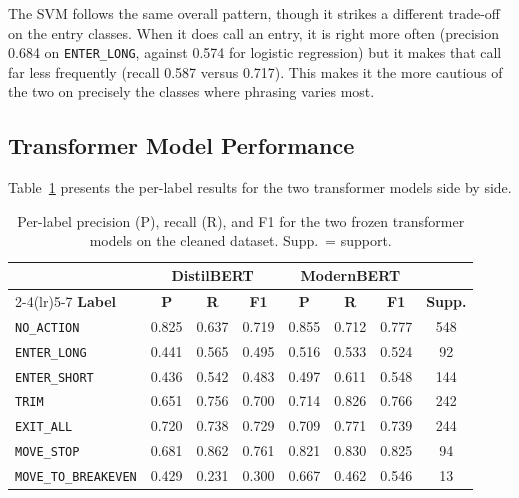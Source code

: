 The SVM follows the same overall pattern, though it strikes a different trade-off on the entry classes. When it does call an entry, it is right more often (precision 0.684 on \texttt{ENTER\_LONG}, against 0.574 for logistic regression) but it makes that call far less frequently (recall 0.587 versus 0.717). This makes it the more cautious of the two on precisely the classes where phrasing varies most.

\subsection{Transformer Model Performance}
\label{sec:results_transformers}

Table~\ref{tab:per_label_transformers} presents the per-label results for the two transformer models side by side.

\begin{table}[H]
\centering
\caption{Per-label precision (P), recall (R), and F1 for the two frozen transformer models on the cleaned dataset. Supp.\ = support.}
\label{tab:per_label_transformers}
\small
\setlength{\tabcolsep}{4pt}
\begin{tabular}{@{}l ccc ccc c@{}}
\toprule
& \multicolumn{3}{c}{\textbf{DistilBERT}} & \multicolumn{3}{c}{\textbf{ModernBERT}} & \\
\cmidrule(lr){2-4}\cmidrule(lr){5-7}
\textbf{Label} & \textbf{P} & \textbf{R} & \textbf{F1} & \textbf{P} & \textbf{R} & \textbf{F1} & \textbf{Supp.} \\
\midrule
\texttt{NO\_ACTION}          & 0.825 & 0.637 & 0.719 & 0.855 & 0.712 & 0.777 & 548 \\
\texttt{ENTER\_LONG}         & 0.441 & 0.565 & 0.495 & 0.516 & 0.533 & 0.524 &  92 \\
\texttt{ENTER\_SHORT}        & 0.436 & 0.542 & 0.483 & 0.497 & 0.611 & 0.548 & 144 \\
\texttt{TRIM}                & 0.651 & 0.756 & 0.700 & 0.714 & 0.826 & 0.766 & 242 \\
\texttt{EXIT\_ALL}           & 0.720 & 0.738 & 0.729 & 0.709 & 0.771 & 0.739 & 244 \\
\texttt{MOVE\_STOP}          & 0.681 & 0.862 & 0.761 & 0.821 & 0.830 & 0.825 &  94 \\
\texttt{MOVE\_TO\_BREAKEVEN} & 0.429 & 0.231 & 0.300 & 0.667 & 0.462 & 0.546 &  13 \\
\bottomrule
\end{tabular}
\end{table}


